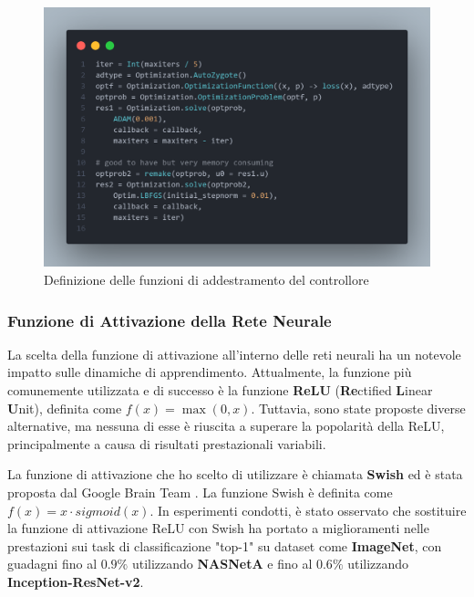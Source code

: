 \begin{figure}[H]
    \begin{center}
		\includegraphics[width=\textwidth]{img/controller3.png}
		\caption{Definizione delle funzioni di addestramento del controllore}
		\label{fig:controller3}
	\end{center}
\end{figure}

\subsubsection*{Funzione di Attivazione della Rete Neurale}
La scelta della funzione di attivazione all'interno delle reti neurali 
ha un notevole impatto sulle dinamiche di apprendimento. Attualmente, 
la funzione più comunemente utilizzata e di successo è la funzione 
\textbf{ReLU} (\textbf{Re}ctified \textbf{L}inear \textbf{U}nit), 
definita come $f(x) = \max(0, x)$. Tuttavia, sono state proposte 
diverse alternative, ma nessuna di esse è riuscita a superare la 
popolarità della ReLU, principalmente a causa di risultati 
prestazionali variabili.

La funzione di attivazione che ho scelto di utilizzare è chiamata 
\textbf{Swish} ed è stata proposta dal Google Brain Team 
\cite{ramachandran2017searching}. La funzione Swish è definita 
come $f(x) = x \cdot sigmoid(x)$. In esperimenti condotti, è 
stato osservato che sostituire la funzione di attivazione ReLU 
con Swish ha portato a miglioramenti nelle prestazioni sui task 
di classificazione "top-1" su dataset come \textbf{ImageNet}, con 
guadagni fino al $0.9\%$ utilizzando \textbf{NASNetA} e fino al 
$0.6\%$ utilizzando \textbf{Inception-ResNet-v2}.


